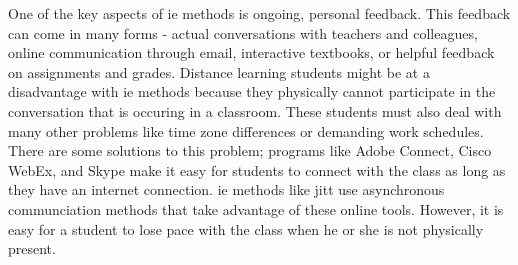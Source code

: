 One of the key aspects of \gls{ie} methods is ongoing, personal feedback. This feedback can come in many forms - actual conversations with teachers and colleagues, online communication through email, interactive textbooks, or helpful feedback on assignments and grades. Distance learning students might be at a disadvantage with \gls{ie} methods because they physically cannot participate in the conversation that is occuring in a classroom. These students must also deal with many other problems like time zone differences or demanding work schedules. There are some solutions to this problem; programs like Adobe Connect, Cisco WebEx, and Skype make it easy for students to connect with the class as long as they have an internet connection. \gls{ie} methods like \gls{jitt} use asynchronous communciation methods that take advantage of these online tools. However, it is easy for a student to lose pace with the class when he or she is not physically present.
